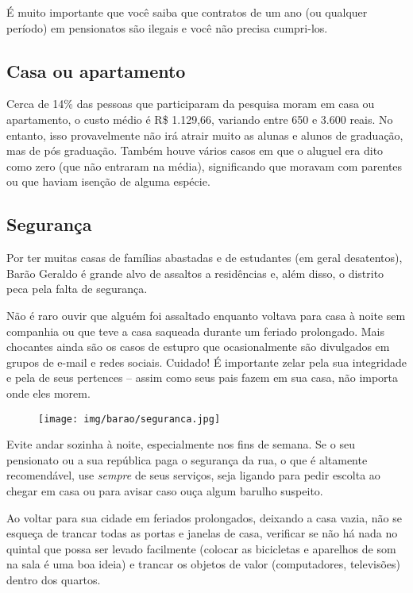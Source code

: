 É muito importante que você saiba que contratos de um ano (ou qualquer período)
em pensionatos são ilegais e você não precisa cumpri-los.

\subsection{Casa ou apartamento}

Cerca de 14\% das pessoas que participaram da pesquisa moram em casa ou
apartamento, o custo médio é R\$ 1.129,66, variando entre 650 e 3.600 reais.
No entanto, isso provavelmente não irá atrair muito as alunas e alunos de
graduação, mas de pós graduação. Também houve vários casos em que o aluguel era
dito como zero (que não entraram na média), significando que moravam com
parentes ou que haviam isenção de alguma espécie.

\subsection{Segurança}

Por ter muitas casas de famílias abastadas e de estudantes (em geral
desatentos), Barão Geraldo é grande alvo de assaltos a residências e, além
disso, o distrito peca pela falta de segurança.

Não é raro ouvir que alguém foi assaltado enquanto voltava para casa à noite
sem companhia ou que teve a casa saqueada durante um feriado prolongado. Mais
chocantes ainda são os casos de estupro que ocasionalmente são divulgados em
grupos de e-mail e redes sociais. Cuidado! É importante zelar pela sua
integridade e pela de seus pertences -- assim como seus pais fazem em sua casa,
não importa onde eles morem.

\begin{figure}[h!]
  \centering
  \texttt{[image: img/barao/seguranca.jpg]}
\end{figure}

Evite andar sozinha à noite, especialmente nos fins de semana. Se o seu
pensionato ou a sua república paga o segurança da rua, o que é altamente
recomendável, use \emph{sempre} de seus serviços, seja ligando para pedir
escolta ao chegar em casa ou para avisar caso ouça algum barulho suspeito.

Ao voltar para sua cidade em feriados prolongados, deixando a casa vazia, não
se esqueça de trancar todas as portas e janelas de casa, verificar se não há
nada no quintal que possa ser levado facilmente (colocar as bicicletas e
aparelhos de som na sala é uma boa ideia) e trancar os objetos de valor
(computadores, televisões) dentro dos quartos.

